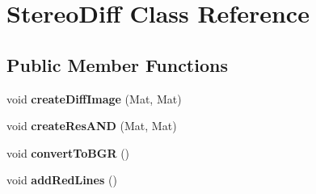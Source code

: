 \hypertarget{class_stereo_diff}{}\section{Stereo\+Diff Class Reference}
\label{class_stereo_diff}
\subsection*{Public Member Functions}
\begin{DoxyCompactItemize}
\item 
void {\bfseries create\+Diff\+Image} (Mat, Mat)\hypertarget{class_stereo_diff_afc5a133f69774c3299450672042cb102}{}\label{class_stereo_diff_afc5a133f69774c3299450672042cb102}

\item 
void {\bfseries create\+Res\+A\+ND} (Mat, Mat)\hypertarget{class_stereo_diff_a7631b179ab681be6e533d97d95d0968a}{}\label{class_stereo_diff_a7631b179ab681be6e533d97d95d0968a}

\item 
void {\bfseries convert\+To\+B\+GR} ()\hypertarget{class_stereo_diff_afe807062ba0099d50a424f888d1edeb2}{}\label{class_stereo_diff_afe807062ba0099d50a424f888d1edeb2}

\item 
void {\bfseries add\+Red\+Lines} ()\hypertarget{class_stereo_diff_a1e7272d98e86d4329d59873a63a5aecb}{}\label{class_stereo_diff_a1e7272d98e86d4329d59873a63a5aecb}

\end{DoxyCompactItemize}
